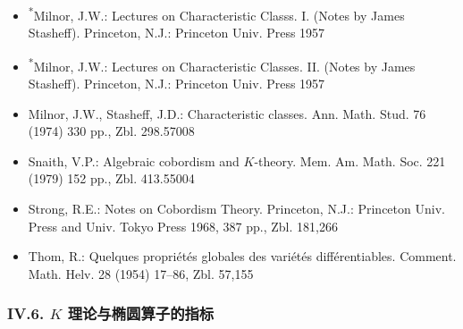 \begin{itemize}
\item \textsuperscript{*}Milnor, J.W.: Lectures on Characteristic Classs. I. (Notes by James Stasheff). Princeton, N.J.: Princeton Univ. Press 1957
\item \textsuperscript{*}Milnor, J.W.: Lectures on Characteristic Classes. II. (Notes by James Stasheff). Princeton, N.J.: Princeton Univ. Press 1957
\item Milnor, J.W., Stasheff, J.D.: Characteristic classes. Ann. Math. Stud. 76 (1974) 330 pp., Zbl. 298.57008
\item Snaith, V.P.: Algebraic cobordism and $K$-theory. Mem. Am. Math. Soc. 221 (1979) 152 pp., Zbl. 413.55004
\item Strong, R.E.: Notes on Cobordism Theory. Princeton, N.J.: Princeton Univ. Press and Univ. Tokyo Press 1968, 387 pp., Zbl. 181,266
\item Thom, R.: Quelques propriétés globales des variétés différentiables. Comment. Math. Helv. 28 (1954) 17--86, Zbl. 57,155
\end{itemize}



\subsubsection*{IV.6. $K$ 理论与椭圆算子的指标}

